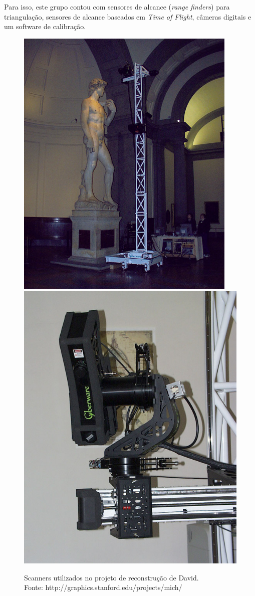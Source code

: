 \documentclass[table, usenames, svgnames, xcolor=dvipsnames]{beamer}
\begin{document}
\begin{frame} 
	\begin{center}
		Para isso, este grupo contou com sensores de alcance (\emph{range finders}) para triangulação, sensores de alcance baseados em \emph{Time of Flight}, câmeras digitais e um software de calibração.
	\end{center}
\end{frame}

\begin{frame} 
	\begin{figure}[!h]
		\centering
		\includegraphics[width=0.4\linewidth]{figs/gantry-and-david4-s.jpg}
		\includegraphics[width=0.4\linewidth]{figs/mgantry-scannerhead-s.jpg}
		\caption{%
		Scanners utilizados no projeto de reconstrução de David. \\
		\tiny{Fonte: http://graphics.stanford.edu/projects/mich/}
		}
	\end{figure}
\end{frame}
\end{document}
